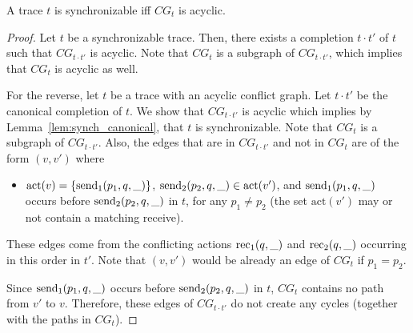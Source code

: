 \begin{theorem}\label{thm:cg} 
A trace $t$ is synchronizable if{f} $CG_t$ is acyclic.
\end{theorem}
\begin{proof}
Let $t$ be a synchronizable trace. Then, there exists a completion $t\cdot t'$ of $t$ such that $CG_{t\cdot t'}$ is acyclic. Note that $CG_{t}$ is a subgraph of $CG_{t\cdot t'}$, which implies that $CG_{t}$ is acyclic as well.

For the reverse, let $t$ be a trace with an acyclic conflict graph. Let $t\cdot t'$ be the canonical completion of $t$. We show that $CG_{t\cdot t'}$ is acyclic which implies by Lemma~\ref{lem:synch_canonical}, that $t$ is synchronizable. Note that $CG_{t}$ is a subgraph of $CG_{t\cdot t'}$. Also, the edges that are in $CG_{t\cdot t'}$ and not in $CG_{t}$ are of the form $(v,v')$ where 
\begin{itemize}
	\item $\mathrm{act}(v)=\{\mathrm{send}_{1}({p_1,q,\_})\}$, $\mathrm{send}_{2}({p_2,q,\_})\in \mathrm{act}(v')$, and $\mathrm{send}_{1}({p_1,q,\_})$ occurs before $\mathrm{send}_{2}({p_2,q,\_})$ in $t$, for any $p_1\neq p_2$ (the set $\mathrm{act}(v')$ may or not contain a matching receive).
\end{itemize}
These edges come from the conflicting actions $\mathrm{rec}_{1}({q,\_})$ and $\mathrm{rec}_{2}({q,\_})$ occurring in this order in $t'$. Note that $(v,v')$ would be already an edge of $CG_{t}$ if $p_1=p_2$. 

Since $\mathrm{send}_{1}({p_1,q,\_})$ occurs before $\mathrm{send}_{2}({p_2,q,\_})$ in $t$, $CG_{t}$ contains no path from $v'$ to $v$. Therefore, these edges of $CG_{t\cdot t'}$ do not create any cycles (together with the paths in  $CG_{t}$).
\end{proof}



